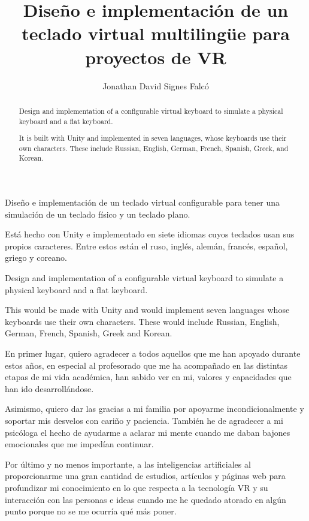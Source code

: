 \documentclass[twoside,spanish,a4paper,12pt]{tfg}
\title{Diseño e implementación de un teclado virtual multilingüe para proyectos de VR}
\author{Jonathan David Signes Falcó}
\begin{document}
	
	\portada
	\cleardoublepage
	\contraportada
	\cleardoublepage
	\declaracion
	\cleardoublepage
	
	
	\begin{resumen}
		Diseño e implementación de un teclado virtual configurable para tener una simulación de un teclado físico y un teclado plano.
		
		Está hecho con Unity e implementado en siete idiomas cuyos teclados usan sus propios caracteres. Entre estos están el ruso, inglés, alemán, francés, español, griego y coreano.
	\end{resumen}
	\cleardoublepage
	
	\begin{abstract}
		Design and implementation of a configurable virtual keyboard to simulate a physical keyboard and a flat keyboard.
		
		It is built with Unity and implemented in seven languages, whose keyboards use their own characters. These include Russian, English, German, French, Spanish, Greek, and Korean.
	\end{abstract}
	\cleardoublepage
	
	\begin{resum}
		Design and implementation of a configurable virtual keyboard to simulate a physical keyboard and a flat keyboard.
		
		This would be made with Unity and would implement seven languages whose keyboards use their own characters. These would include Russian, English, German, French, Spanish, Greek and Korean.
	\end{resum}
	\cleardoublepage
	
	
	\begin{agradecimientos}
		En primer lugar, quiero agradecer a todos aquellos que me han apoyado durante estos años, en especial al profesorado que me ha acompañado en las distintas etapas de mi vida académica, han sabido ver en mi, valores y capacidades que han ido desarrollándose. 
		
		Asimismo, quiero dar las gracias a mi familia por apoyarme incondicionalmente y soportar mis desvelos con cariño y paciencia. También he de agradecer a mi psicóloga el hecho de ayudarme a aclarar mi mente cuando me daban bajones emocionales que me impedían continuar.
		
		Por último y no menos importante, a las inteligencias artificiales al proporcionarme una gran cantidad de estudios, artículos y páginas web para profundizar mi conocimiento en lo que respecta a la tecnología VR y su interacción con las personas e ideas cuando me he quedado atorado en algún punto porque no se me ocurría qué más poner.
	\end{agradecimientos}
	\cleardoublepage
	
\end{document}
